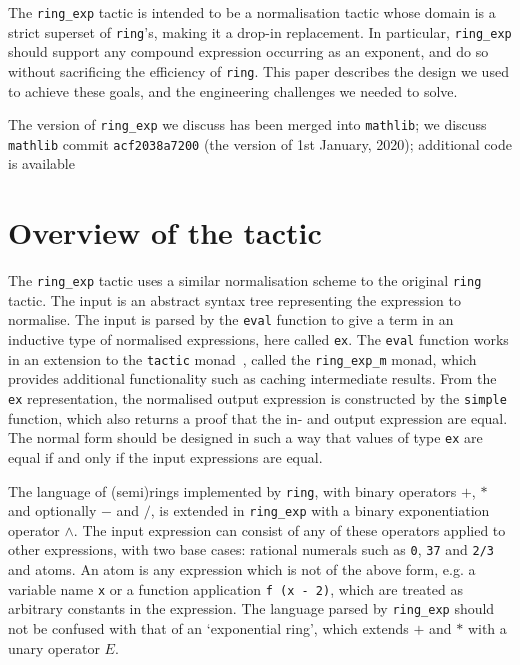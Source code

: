 \documentclass{llncs}
\newcommand{\lean}[1]{\texttt{#1}\xspace} %
\newcommand{\pow}{$\wedge$\xspace}
\newcommand{\ring}{\lean{ring}}
\newcommand{\ringexp}{\lean{ring\_exp}}
\begin{document}

The \ringexp tactic is intended to be a normalisation tactic whose domain is a strict superset of \lean{ring}'s,
making it a drop-in replacement.
In particular, \ringexp should support any compound expression occurring as an exponent,
and do so without sacrificing the efficiency of \lean{ring}.
This paper describes the design we used to achieve these goals,
and the engineering challenges we needed to solve.

The version of \ringexp we discuss has been merged into \texttt{mathlib};
we discuss \texttt{mathlib} commit \texttt{acf2038a7200} (the version of 1st January, 2020);
additional code is available %

\section{Overview of the tactic}

The \ringexp tactic uses a similar normalisation scheme to the original \ring tactic.
The input is an abstract syntax tree representing the expression to normalise.
The input is parsed by the \lean{eval} function to give a term in an inductive type of normalised expressions, here called \lean{ex}.
The \lean{eval} function works in an extension to the \lean{tactic} monad~\cite{lean-tactics},
called the \lean{ring\_exp\_m} monad,
which provides additional functionality such as caching intermediate results.
From the \lean{ex} representation, the normalised output expression is constructed by the \lean{simple} function,
which also returns a proof that the in- and output expression are equal.
The normal form should be designed in such a way that values of type \lean{ex} are equal if and only if the input expressions are equal.

The language of (semi)rings implemented by \ring, with binary operators $+$, $*$ and optionally $-$ and $/$,
is extended in \ringexp with a binary exponentiation operator \pow.
The input expression can consist of any of these operators applied to other expressions,
with two base cases: rational numerals such as \lean{0}, \lean{37} and \lean{2/3} and atoms.
An atom is any expression which is not of the above form, e.g. a variable name \lean{x} or a function application \lean{f (x - 2)},
which are treated as arbitrary constants in the expression.
The language parsed by \ringexp should not be confused with that of an `exponential ring', which extends $+$ and $*$ with a unary operator $E$. %
\end{document}
